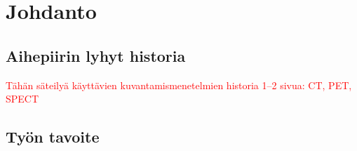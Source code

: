 \section{Johdanto}
\subsection{Aihepiirin lyhyt historia}
\textcolor{red}{Tähän säteilyä käyttävien kuvantamismenetelmien historia 1--2 sivua: CT, PET, SPECT}
\subsection{Työn tavoite}